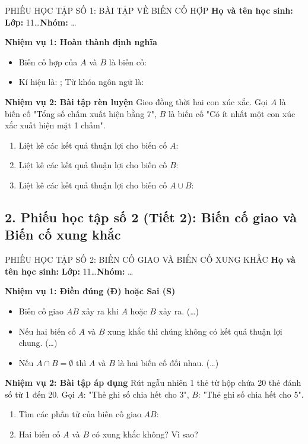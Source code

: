 \documentclass[12pt, a4paper]{article}
\begin{document}
\begin{pedabox}{PHIẾU HỌC TẬP SỐ 1: BÀI TẬP VỀ BIẾN CỐ HỢP}
    \textbf{Họ và tên học sinh:} \dotfill \textbf{Lớp:} 11\dots \textbf{Nhóm:} \dots
    
    \textbf{Nhiệm vụ 1: Hoàn thành định nghĩa}
    \begin{itemize}[leftmargin=0.6cm]
        \item Biến cố hợp của $A$ và $B$ là biến cố: \dotfill
        \item Kí hiệu là: \dotfill; Từ khóa ngôn ngữ là: \dotfill
    \end{itemize}

    \textbf{Nhiệm vụ 2: Bài tập rèn luyện}
    Gieo đồng thời hai con xúc xắc. Gọi $A$ là biến cố "Tổng số chấm xuất hiện bằng 7", $B$ là biến cố "Có ít nhất một con xúc xắc xuất hiện mặt 1 chấm".
    \begin{enumerate}
        \item Liệt kê các kết quả thuận lợi cho biến cố $A$: \dotfill
        \item Liệt kê các kết quả thuận lợi cho biến cố $B$: \dotfill
        \item Liệt kê các kết quả thuận lợi cho biến cố $A \cup B$: \dotfill
    \end{enumerate}
\end{pedabox}

\subsection*{2. Phiếu học tập số 2 (Tiết 2): Biến cố giao và Biến cố xung khắc}

\begin{pedabox}{PHIẾU HỌC TẬP SỐ 2: BIẾN CỐ GIAO VÀ BIẾN CỐ XUNG KHẮC}
    \textbf{Họ và tên học sinh:} \dotfill \textbf{Lớp:} 11\dots \textbf{Nhóm:} \dots

    \textbf{Nhiệm vụ 1: Điền đúng (Đ) hoặc Sai (S)}
    \begin{itemize}[leftmargin=0.6cm]
        \item Biến cố giao $AB$ xảy ra khi $A$ hoặc $B$ xảy ra. (\dots)
        \item Nếu hai biến cố $A$ và $B$ xung khắc thì chúng không có kết quả thuận lợi chung. (\dots)
        \item Nếu $A \cap B = \emptyset$ thì $A$ và $B$ là hai biến cố đối nhau. (\dots)
    \end{itemize}

    \textbf{Nhiệm vụ 2: Bài tập áp dụng}
    Rút ngẫu nhiên 1 thẻ từ hộp chứa 20 thẻ đánh số từ 1 đến 20. Gọi $A$: "Thẻ ghi số chia hết cho 3", $B$: "Thẻ ghi số chia hết cho 5".
    \begin{enumerate}
        \item Tìm các phần tử của biến cố giao $AB$: \dotfill
        \item Hai biến cố $A$ và $B$ có xung khắc không? Vì sao? \dotfill
    \end{enumerate}
\end{pedabox}
\end{document}
